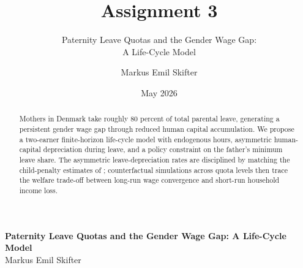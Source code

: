 \documentclass[12pt]{article}
\author{Markus Emil Skifter}
\title{Assignment 3}
\subtitle{Paternity Leave Quotas and the Gender Wage Gap:\\ A Life-Cycle Model}
\date{May 2026}
\begin{document}
\maketitle

\onehalfspacing

{\selectfont

\begin{center}
  {\large \textbf{Paternity Leave Quotas and the Gender Wage Gap: A Life-Cycle Model}}\\[0.6em]
  {\normalsize Markus Emil Skifter}
\end{center}

\vspace{0.3em}

\begin{abstract}
\noindent
Mothers in Denmark take roughly 80 percent of total parental leave, generating a persistent gender wage gap through reduced human capital accumulation. We propose a two-earner finite-horizon life-cycle model with endogenous hours, asymmetric human-capital depreciation during leave, and a policy constraint on the father's minimum leave share. The asymmetric leave-depreciation rates are disciplined by matching the child-penalty estimates of \citet{kleven2019children}; counterfactual simulations across quota levels then trace the welfare trade-off between long-run wage convergence and short-run household income loss.
\end{abstract}

\bigskip



\printbibliography



} %
\end{document}
